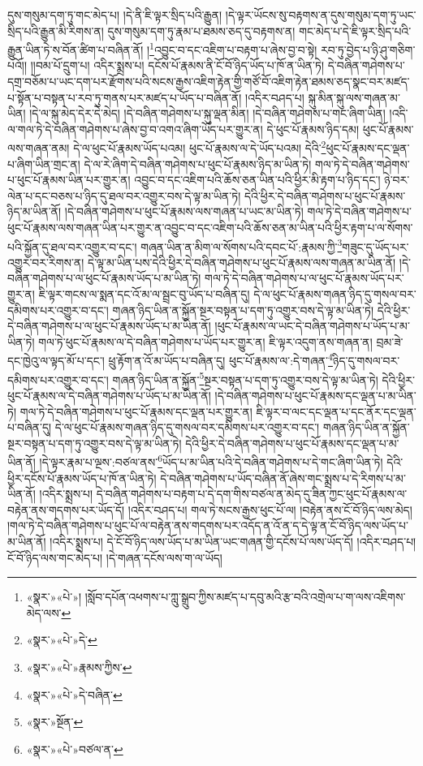དུས་གསུམ་དག་ཏུ་གང་མེད་པ། །དེ་ནི་ཇི་ལྟར་སྲིད་པའི་རྒྱུན། །དེ་ལྟར་ཡོངས་སུ་བརྟགས་ན་དུས་གསུམ་དག་ཏུ་ཡང་སྲིད་པའི་རྒྱུན་མི་རིགས་ན། དུས་གསུམ་དག་ཏུ་རྣམ་པ་ཐམས་ཅད་དུ་བརྟགས་ན། གང་མེད་པ་དེ་ཇི་ལྟར་སྲིད་པའི་རྒྱུན་ཡིན་ཏེ་ས་བོན་ཚིག་པ་བཞིན་ནོ། །\footnote{«སྣར་»«པེ་»། །སློབ་དཔོན་འཕགས་པ་ཀླུ་སྒྲུབ་ཀྱིས་མཛད་པ་དབུ་མའི་རྩ་བའི་འགྲེལ་པ་ག་ལས་འཇིགས་མེད་ལས་}འབྱུང་བ་དང་འཇིག་པ་བརྟག་པ་ཞེས་བྱ་བ་སྟེ། རབ་ཏུ་བྱེད་པ་ཉི་ཤུ་གཅིག་པའོ།། །།བམ་པོ་དྲུག་པ། འདིར་སྨྲས་པ། དངོས་པོ་རྣམས་ནི་ངོ་བོ་ཉིད་ཡོད་པ་ཁོ་ན་ཡིན་ཏེ། དེ་བཞིན་གཤེགས་པ་དགྲ་བཅོམ་པ་ཡང་དག་པར་རྫོགས་པའི་སངས་རྒྱས་འཇིག་རྟེན་གྱི་གཙོ་བོ་འཇིག་རྟེན་ཐམས་ཅད་སྣང་བར་མཛད་པ་སྟོན་པ་བསྟན་པ་རབ་ཏུ་གནས་པར་མཛད་པ་ཡོད་པ་བཞིན་ནོ། །འདིར་བཤད་པ། སྐུ་མིན་སྐུ་ལས་གཞན་མ་ཡིན། །དེ་ལ་སྐུ་མེད་དེར་དེ་མེད། །དེ་བཞིན་གཤེགས་པ་སྐུ་ལྡན་མིན། །དེ་བཞིན་གཤེགས་པ་གང་ཞིག་ཡིན། །འདི་ལ་གལ་ཏེ་དེ་བཞིན་གཤེགས་པ་ཞེས་བྱ་བ་འགའ་ཞིག་ཡོད་པར་གྱུར་ན། དེ་ཕུང་པོ་རྣམས་ཉིད་དམ། ཕུང་པོ་རྣམས་ལས་གཞན་ནམ། དེ་ལ་ཕུང་པོ་རྣམས་ཡོད་པའམ། ཕུང་པོ་རྣམས་ལ་དེ་ཡོད་པའམ། དེའི་\footnote{«སྣར་»«པེ་»དེ་}ཕུང་པོ་རྣམས་དང་ལྡན་པ་ཞིག་ཡིན་གྲང་ན། དེ་ལ་རེ་ཞིག་དེ་བཞིན་གཤེགས་པ་ཕུང་པོ་རྣམས་ཉིད་མ་ཡིན་ཏེ། གལ་ཏེ་དེ་བཞིན་གཤེགས་པ་ཕུང་པོ་རྣམས་ཡིན་པར་གྱུར་ན། འབྱུང་བ་དང་འཇིག་པའི་ཆོས་ཅན་ཡིན་པའི་ཕྱིར་མི་རྟག་པ་ཉིད་དང་། ཉེ་བར་ལེན་པ་དང་བཅས་པ་ཉིད་དུ་ཐལ་བར་འགྱུར་བས་དེ་ལྟ་མ་ཡིན་ཏེ། དེའི་ཕྱིར་དེ་བཞིན་གཤེགས་པ་ཕུང་པོ་རྣམས་ཉིད་མ་ཡིན་ནོ། །དེ་བཞིན་གཤེགས་པ་ཕུང་པོ་རྣམས་ལས་གཞན་པ་ཡང་མ་ཡིན་ཏེ། གལ་ཏེ་དེ་བཞིན་གཤེགས་པ་ཕུང་པོ་རྣམས་ལས་གཞན་ཡིན་པར་གྱུར་ན་འབྱུང་བ་དང་འཇིག་པའི་ཆོས་ཅན་མ་ཡིན་པའི་ཕྱིར་རྟག་པ་ལ་སོགས་པའི་སྐྱོན་དུ་ཐལ་བར་འགྱུར་བ་དང་། གཞན་ཡིན་ན་མིག་ལ་སོགས་པའི་དབང་པོ་:རྣམས་ཀྱི་\footnote{«སྣར་»«པེ་»རྣམས་ཀྱིས་}གཟུང་དུ་ཡོད་པར་འགྱུར་བར་རིགས་ན། དེ་ལྟ་མ་ཡིན་པས་དེའི་ཕྱིར་དེ་བཞིན་གཤེགས་པ་ཕུང་པོ་རྣམས་ལས་གཞན་མ་ཡིན་ནོ། །དེ་བཞིན་གཤེགས་པ་ལ་ཕུང་པོ་རྣམས་ཡོད་པ་མ་ཡིན་ཏེ། གལ་ཏེ་དེ་བཞིན་གཤེགས་པ་ལ་ཕུང་པོ་རྣམས་ཡོད་པར་གྱུར་ན། ཇི་ལྟར་གངས་ལ་སྨན་དང་འོ་མ་ལ་སྦྲང་བུ་ཡོད་པ་བཞིན་དུ། དེ་ལ་ཕུང་པོ་རྣམས་གཞན་ཉིད་དུ་གསལ་བར་དམིགས་པར་འགྱུར་བ་དང་། གཞན་ཉིད་ཡིན་ན་སྐྱོན་སྔར་བསྟན་པ་དག་ཏུ་འགྱུར་བས་དེ་ལྟ་མ་ཡིན་ཏེ། དེའི་ཕྱིར་དེ་བཞིན་གཤེགས་པ་ལ་ཕུང་པོ་རྣམས་ཡོད་པ་མ་ཡིན་ནོ། །ཕུང་པོ་རྣམས་ལ་ཡང་དེ་བཞིན་གཤེགས་པ་ཡོད་པ་མ་ཡིན་ཏེ། གལ་ཏེ་ཕུང་པོ་རྣམས་ལ་དེ་བཞིན་གཤེགས་པ་ཡོད་པར་གྱུར་ན། ཇི་ལྟར་འདུག་ནས་གཞན་ན། བྲམ་ཟེ་དང་ཁྱེའུ་ལ་ལྟད་མོ་པ་དང་། ཕྲུ་རྟོག་ན་འོ་མ་ཡོད་པ་བཞིན་དུ། ཕུང་པོ་རྣམས་ལ་:དེ་གཞན་\footnote{«སྣར་»«པེ་»དེ་བཞིན་}ཉིད་དུ་གསལ་བར་དམིགས་པར་འགྱུར་བ་དང་། གཞན་ཉིད་ཡིན་ན་སྐྱོན་\footnote{«སྣར་»སྔོན་}སྔར་བསྟན་པ་དག་ཏུ་འགྱུར་བས་དེ་ལྟ་མ་ཡིན་ཏེ། དེའི་ཕྱིར་ཕུང་པོ་རྣམས་ལ་དེ་བཞིན་གཤེགས་པ་ཡོད་པ་མ་ཡིན་ནོ། །དེ་བཞིན་གཤེགས་པ་ཕུང་པོ་རྣམས་དང་ལྡན་པ་མ་ཡིན་ཏེ། གལ་ཏེ་དེ་བཞིན་གཤེགས་པ་ཕུང་པོ་རྣམས་དང་ལྡན་པར་གྱུར་ན། ཇི་ལྟར་བ་ལང་དང་ལྡན་པ་དང་ནོར་དང་ལྡན་པ་བཞིན་དུ། དེ་ལ་ཕུང་པོ་རྣམས་གཞན་ཉིད་དུ་གསལ་བར་དམིགས་པར་འགྱུར་བ་དང་། གཞན་ཉིད་ཡིན་ན་སྐྱོན་སྔར་བསྟན་པ་དག་ཏུ་འགྱུར་བས་དེ་ལྟ་མ་ཡིན་ཏེ། དེའི་ཕྱིར་དེ་བཞིན་གཤེགས་པ་ཕུང་པོ་རྣམས་དང་ལྡན་པ་མ་ཡིན་ནོ། །དེ་ལྟར་རྣམ་པ་ལྔས་:བཙལ་ནས་\footnote{«སྣར་»«པེ་»བཙལ་ན་}ཡོད་པ་མ་ཡིན་པའི་དེ་བཞིན་གཤེགས་པ་དེ་གང་ཞིག་ཡིན་ཏེ། དེའི་ཕྱིར་དངོས་པོ་རྣམས་ཡོད་པ་ཁོ་ན་ཡིན་ཏེ། དེ་བཞིན་གཤེགས་པ་ཡོད་བཞིན་ནོ་ཞེས་གང་སྨྲས་པ་དེ་རིགས་པ་མ་ཡིན་ནོ། །འདིར་སྨྲས་པ། དེ་བཞིན་གཤེགས་པ་བརྟག་པ་དེ་དག་གིས་བཙལ་ན་མེད་དུ་ཟིན་ཀྱང་ཕུང་པོ་རྣམས་ལ་བརྟེན་ནས་གདགས་པར་ཡོད་དོ། །འདིར་བཤད་པ། གལ་ཏེ་སངས་རྒྱས་ཕུང་པོ་ལ། །བརྟེན་ནས་ངོ་བོ་ཉིད་ལས་མེད། །གལ་ཏེ་དེ་བཞིན་གཤེགས་པ་ཕུང་པོ་ལ་བརྟེན་ནས་གདགས་པར་འདོད་ན་འོ་ན་ད་དེ་ལྟ་ན་ངོ་བོ་ཉིད་ལས་ཡོད་པ་མ་ཡིན་ནོ། །འདིར་སྨྲས་པ། དེ་ངོ་བོ་ཉིད་ལས་ཡོད་པ་མ་ཡིན་ཡང་གཞན་གྱི་དངོས་པོ་ལས་ཡོད་དོ། །འདིར་བཤད་པ། ངོ་བོ་ཉིད་ལས་གང་མེད་པ། །དེ་གཞན་དངོས་ལས་ག་ལ་ཡོད། 